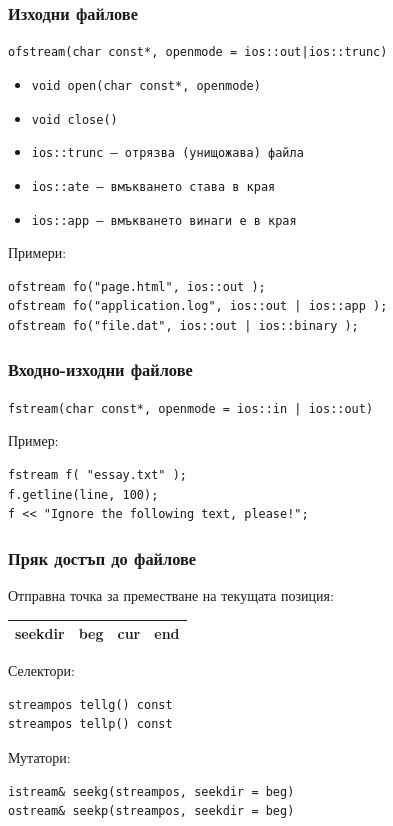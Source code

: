 \documentclass{beamer}
\begin{document}
\begin{frame}[fragile]
  \frametitle{Изходни файлове}

  \verb#ofstream(char const*, openmode = ios::out|ios::trunc)#
  \vspace{1em}

  \begin{itemize}
  \item \verb#void open(char const*, openmode)#
  \item \verb#void close()#
  \item \tt{ios::trunc} --- отрязва (унищожава) файла
  \item \tt{ios::ate} --- вмъкването става в края
  \item \tt{ios::app} --- вмъкването винаги е в края
  \end{itemize}
  \vspace{1em}

  Примери:
\begin{verbatim}
ofstream fo("page.html", ios::out );
ofstream fo("application.log", ios::out | ios::app );
ofstream fo("file.dat", ios::out | ios::binary );
\end{verbatim}

\end{frame}

\begin{frame}[fragile]
  \frametitle{Входно-изходни файлове}

  \verb#fstream(char const*, openmode = ios::in | ios::out)#
  \vspace{1em}
  
  Пример:
\begin{verbatim}
fstream f( "essay.txt" );
f.getline(line, 100);
f << "Ignore the following text, please!";
\end{verbatim}
\end{frame}

\begin{frame}[fragile]
  \frametitle{Пряк достъп до файлове}

  Отправна точка за преместване на текущата позиция:

  \begin{tabular}{|c||c|c|c|}
    \hline
    seekdir&beg&cur&end\\
    \hline
  \end{tabular}
  \vspace{2em}

  Селектори:
\begin{verbatim}
streampos tellg() const
streampos tellp() const
\end{verbatim}

  Мутатори:
\begin{verbatim}
istream& seekg(streampos, seekdir = beg)
ostream& seekp(streampos, seekdir = beg)
\end{verbatim}

\end{frame}
\end{document}
